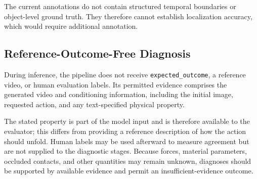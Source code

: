 The current annotations do not contain structured temporal boundaries or object-level ground truth. They therefore cannot establish localization accuracy, which would require additional annotation.

\subsection{Reference-Outcome-Free Diagnosis}
\label{app:ground-truth-free}
During inference, the pipeline does not receive \texttt{expected\_outcome}, a reference video, or human evaluation labels. Its permitted evidence comprises the generated video and conditioning information, including the initial image, requested action, and any text-specified physical property.

The stated property is part of the model input and is therefore available to the evaluator; this differs from providing a reference description of how the action should unfold. Human labels may be used afterward to measure agreement but are not supplied to the diagnostic stages. Because forces, material parameters, occluded contacts, and other quantities may remain unknown, diagnoses should be supported by available evidence and permit an insufficient-evidence outcome.
